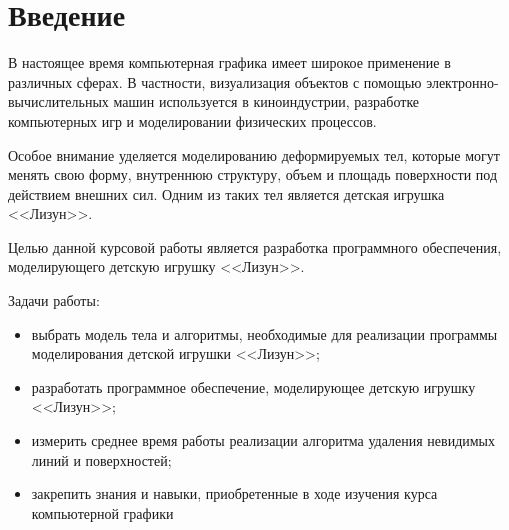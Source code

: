 \chapter*{Введение}

В настоящее время компьютерная графика имеет широкое применение в
различных сферах. В частности, визуализация объектов с помощью электронно-вычислительных машин используется в киноиндустрии, разработке компьютерных
игр и моделировании физических процессов.

Особое внимание уделяется моделированию деформируемых тел, которые
могут менять свою форму, внутреннюю структуру, объем и площадь поверхности
под действием внешних сил. Одним из таких тел является детская игрушка
<<Лизун>>.

Целью данной курсовой работы является разработка программного обеспечения, моделирующего детскую игрушку <<Лизун>>.

Задачи работы:

\begin{itemize}
	\item выбрать модель тела и алгоритмы, необходимые для реализации программы моделирования детской игрушки <<Лизун>>;
	
	\item разработать программное обеспечение, моделирующее детскую игрушку <<Лизун>>;

	\item измерить среднее время работы реализации алгоритма удаления невидимых линий и поверхностей;
	
	\item закрепить знания и навыки, приобретенные в ходе изучения курса компьютерной графики
\end{itemize}

\clearpage
